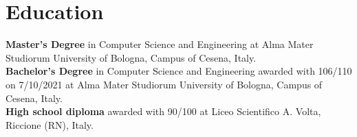 \documentclass[curriculum-vitae-eng]{subfiles}
\begin{document}
	\section*{Education}
		 \textbf{Master's Degree} in Computer Science and Engineering at Alma Mater Studiorum University of Bologna, Campus of Cesena, Italy.\\
		
		 \textbf{Bachelor's Degree} in Computer Science and Engineering awarded with 106/110 on 7/10/2021 at Alma Mater Studiorum University of Bologna, Campus of Cesena, Italy.\\

		 \textbf{High school diploma} awarded with 90/100 at Liceo Scientifico A. Volta, Riccione (RN), Italy.
		
\end{document}
